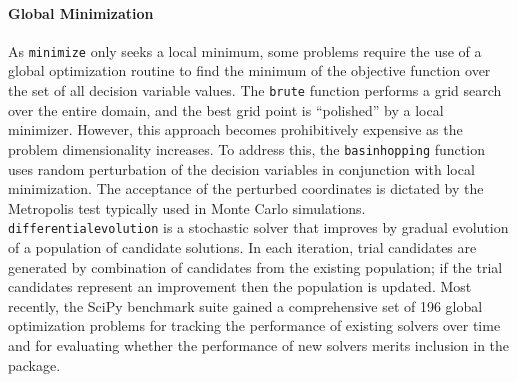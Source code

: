 \paragraph{Global Minimization}
As \texttt{minimize} only seeks a local minimum, some problems require the use of a global optimization routine to find the minimum of the objective function over the set of all decision variable values. %
The \texttt{brute} function performs a grid search over the entire domain, and the best grid point is ``polished'' by a local minimizer. However, this approach becomes prohibitively expensive as the problem dimensionality increases.
To address this, the
\texttt{basinhopping} \cite{Wales1997} function uses random perturbation of the decision variables in conjunction with local minimization. The acceptance of the perturbed coordinates is dictated by the Metropolis test typically used in Monte Carlo simulations. 
\texttt{differential\textunderscore evolution} \cite{Wormington1999,Storn1997} is a stochastic solver that improves by gradual evolution of a population of candidate solutions. In each iteration, trial candidates are generated by combination of candidates from the existing population; if the trial candidates represent an improvement then the population is updated. 
Most recently, the SciPy benchmark suite gained a comprehensive set of 196 global optimization problems
for tracking the performance of existing solvers over time and for evaluating whether the performance of new solvers merits inclusion in the package. 
